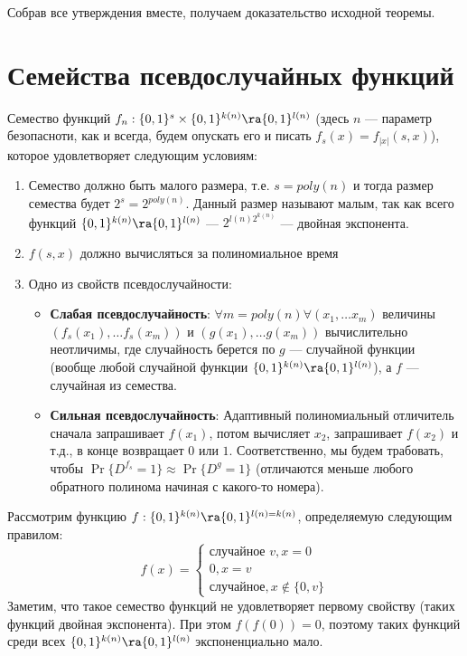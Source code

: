\begin{note}
    Собрав все утверждения вместе, получаем доказательство исходной теоремы.
\end{note}


\section{Семейства псевдослучайных функций}

\begin{definition}
    Семество функций \(f_n: \{0, 1\}^s \times \{0, 1\}^{k(n)} \ra \{0, 1\}^{l(n)}\) (здесь \(n\) --- параметр безопасноти, как и всегда, будем опускать его и писать \(f_s(x) = f_{|x|}(s, x)\)), которое удовлетворяет следующим условиям:
    \begin{enumerate}
        \item Семество должно быть малого размера, т.е. \(s = poly(n)\) и тогда размер семества будет \(2^s = 2^{poly(n)}\). Данный размер называют малым, так как всего функций \(\{0, 1\}^{k(n)} \ra \{0, 1\}^{l(n)}\) --- \(2^{l(n)2^{k(n)}}\) --- двойная экспонента.
        \item \(f(s, x)\) должно вычисляться за полиномиальное время
        \item Одно из свойств псевдослучайности:
        \begin{itemize}
            \item \textbf{Слабая псевдослучайность}: \(\forall m = poly(n) \forall (x_1, \dots x_m)\) величины \((f_s(x_1), \dots f_s(x_m))\) и \((g(x_1), \dots g(x_m))\) вычислительно неотличимы, где случайность берется по \(g\) --- случайной функции (вообще любой случайной функции \(\{0, 1\}^{k(n)} \ra \{0, 1\}^{l(n)}\)), а \(f\) --- случайная из семества.
            \item \textbf{Сильная псевдослучайность}: Адаптивный полиномиальный отличитель сначала запрашивает \(f(x_1)\), потом вычисляет \(x_2\), запрашивает \(f(x_2)\) и т.д., в конце возвращает \(0\) или \(1\). Соответственно, мы будем трабовать, чтобы \(\Pr\{D^{f_s} = 1\} \approx \Pr\{D^{g} = 1\}\) (отличаются меньше любого обратного полинома начиная с какого-то номера).
        \end{itemize}
    \end{enumerate}
\end{definition}

\begin{example}
    Рассмотрим функцию \(f: \{0, 1\}^{k(n)} \ra \{0, 1\}^{l(n) = k(n)}\), определяемую следующим правилом:
    \[f(x) = \begin{cases}
        \text{случайное }v, x = 0 \\
        0, x = v \\
        \text{случайное}, x \notin \{0, v\}
    \end{cases}\]
    Заметим, что такое семество функций не удовлетворяет первому свойству (таких функций двойная экспонента). При этом \(f(f(0)) = 0\), поэтому таких функций среди всех \(\{0, 1\}^{k(n)} \ra \{0, 1\}^{l(n)}\) экспоненциально мало.
\end{example}

